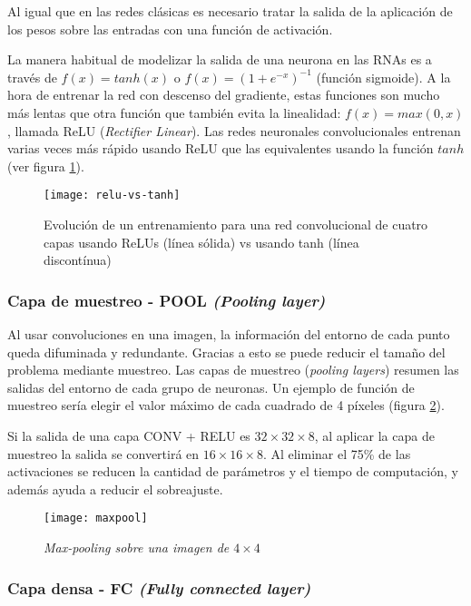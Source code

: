 Al igual que en las redes clásicas es necesario tratar la salida de la aplicación de los pesos sobre las entradas con una función de activación. 

La manera habitual de modelizar la salida de una neurona en las RNAs es a
través de $f(x) = tanh(x)$ o $f(x) = (1 + e^{-x})^{-1}$ (función sigmoide). A
la hora de entrenar la red con descenso del gradiente, estas funciones son
mucho más lentas que otra función que también evita la linealidad: $f(x) =
max(0, x)$, llamada ReLU (\textit{Rectifier Linear}). Las redes neuronales
convolucionales entrenan varias veces más rápido usando ReLU  que las
equivalentes usando la función $tanh$ (ver figura \ref{relu-vs-tanh}).

\begin{figure}
    \centering
    \caption{Evolución de un entrenamiento para una red convolucional de cuatro capas usando ReLUs (línea sólida) vs usando tanh (línea discontínua) \parencite{krizhevsky2012imagenet}}
  \label{relu-vs-tanh}
  \texttt{[image: relu-vs-tanh]}
\end{figure}

\subsubsection{Capa de muestreo - POOL \textit{(Pooling layer)}}

Al usar convoluciones en una imagen, la información del entorno de cada punto
queda difuminada y redundante. Gracias a esto se puede reducir el tamaño del
problema mediante muestreo. Las capas de muestreo (\textit{pooling layers})
resumen las salidas del entorno de cada grupo de neuronas. Un ejemplo de
función de muestreo sería elegir el valor máximo de cada cuadrado de 4 píxeles
(figura \ref{maxpool}).

Si la salida de una capa CONV + RELU es $32 \times 32 \times 8$, al aplicar la capa de muestreo la salida se convertirá en $16 \times 16 \times 8$. Al eliminar el 75\% de las activaciones se reducen la cantidad de parámetros y el tiempo de computación, y además ayuda a reducir el sobreajuste.

\begin{figure}
    \centering
    \caption{\textit{Max-pooling sobre una imagen de $4\times4$}}
  \label{maxpool}
  \texttt{[image: maxpool]}
\end{figure}

\subsubsection{Capa densa - FC \textit{(Fully connected layer)}}

